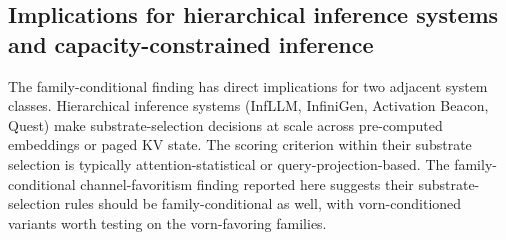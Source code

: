 \documentclass[10pt]{article}
\begin{document}
\subsection{Implications for hierarchical inference systems and capacity-constrained inference}\label{64-implications-for-hierarchical-inference-systems-and-capacity-constrained-inference}

The family-conditional finding has direct implications for two adjacent
system classes. Hierarchical inference systems (InfLLM, InfiniGen,
Activation Beacon, Quest) make substrate-selection decisions at scale
across pre-computed embeddings or paged KV state. The scoring criterion
within their substrate selection is typically attention-statistical or
query-projection-based. The family-conditional channel-favoritism
finding reported here suggests their substrate-selection rules should be
family-conditional as well, with vorn-conditioned variants
worth testing on the vorn-favoring families.
\end{document}
